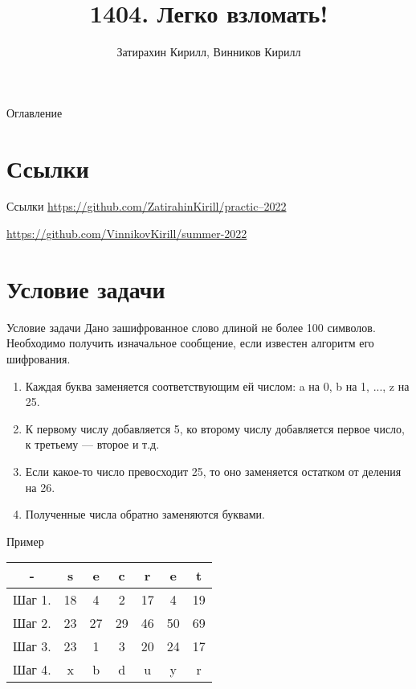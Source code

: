 \documentclass[12pt]{beamer}
\title{1404. Легко взломать!}
\author{Затирахин Кирилл, Винников Кирилл}
\begin{document}
\maketitle

\begin{frame}{Оглавление}
    \tableofcontents
\end{frame}

\section{Ссылки}

\begin{frame}{Ссылки}
     \href{https://github.com/ZatirahinKirill/practic--2022}{https://github.com/ZatirahinKirill/practic--2022}

     \href{https://github.com/VinnikovKirill/summer-2022}{https://github.com/VinnikovKirill/summer-2022}
\end{frame}

\section{Условие задачи}

\begin{frame}{Условие задачи}
    Дано зашифрованное слово длиной не более 100 символов. Необходимо получить изначальное сообщение, если известен алгоритм его шифрования.
    \begin{enumerate}
        \item Каждая буква заменяется соответствующим ей числом: a на 0, b на 1, ..., z на 25.
        \item К первому числу добавляется 5, ко второму числу добавляется первое число, к третьему — второе и т.д. 
        \item Если какое-то число превосходит 25, то оно заменяется остатком от деления на 26. 
        \item Полученные числа обратно заменяются буквами.
    \end{enumerate}
\end{frame}

\begin{frame}{Пример}

\setlength{}
\renewcommand*{\arraystretch}{2}

    \begin{table}
    \centering
    \begin{tabular}{|c|c|c|c|c|c|c|}
        \hline
        - & s & e & c & r & e & t\\
        \hline
        Шаг 1. & 18 & 4 & 2 & 17 & 4 & 19\\
        Шаг 2. & 23 & 27 & 29 & 46 & 50 & 69\\
        Шаг 3. & 23 & 1 & 3 & 20 & 24 & 17\\
        Шаг 4. & x & b & d & u & y & r\\
        \hline
    \end{tabular}
    \end{table}
    
\end{frame}
\end{document}
